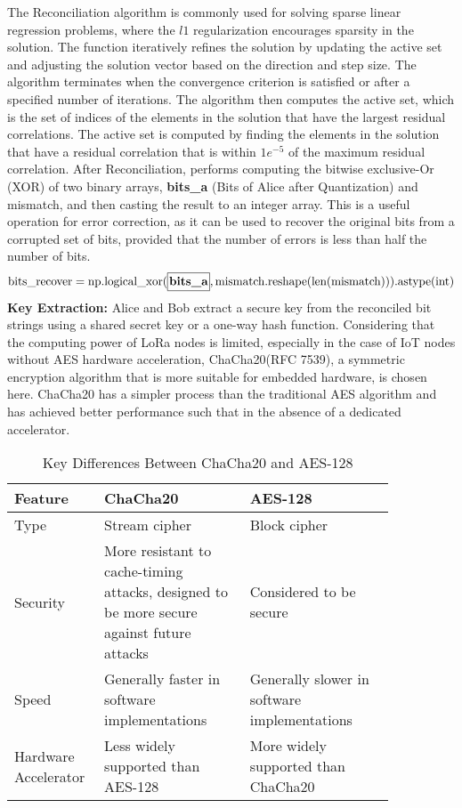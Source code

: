 The Reconciliation algorithm is commonly used for solving sparse linear regression problems, where the \(l1\) regularization encourages sparsity in the solution. The function iteratively refines the solution by updating the active set and adjusting the solution vector based on the direction and step size. The algorithm terminates when the convergence criterion is satisfied or after a specified number of iterations.
The algorithm then computes the active set, which is the set of indices of the elements in the solution that have the largest residual correlations. The active set is computed by finding the elements in the solution that have a residual correlation that is within \(1e^{-5}\) of the maximum residual correlation.
After Reconciliation, performs computing the bitwise exclusive-Or (XOR) of two binary arrays, \textbf{bits\_a} (Bits of Alice after Quantization) and mismatch, and then casting the result to an integer array. This is a useful operation for error correction, as it can be used to recover the original bits from a corrupted set of bits, provided that the number of errors is less than half the number of bits. 
  \[
  \text{{bits\_recover}} = \text{{np.logical\_xor}}(\textbf{\framebox[1.1\width]{{bits\_a}}}, \text{{mismatch}}.\text{{reshape}}(\text{{len}}(\text{{mismatch}}))).\text{{astype(int)}}
  \]
\textbf{Key Extraction:} Alice and Bob extract a secure key from the reconciled bit strings using a shared secret key or a one-way hash function. Considering that the computing power of LoRa nodes is limited, especially in the case of IoT nodes without AES hardware acceleration, ChaCha20(RFC 7539)\cite{rfc7539}, a symmetric encryption algorithm that is more suitable for embedded hardware, is chosen here. ChaCha20 has a simpler process than the traditional AES algorithm and has achieved better performance such that in the absence of a dedicated accelerator\cite{7507408,7927078}.
\begin{table}
    \centering
    \caption{Key Differences Between ChaCha20 and AES-128}
    \begin{tabular}{p{0.15\linewidth}p{0.35\linewidth}p{0.35\linewidth}}
      \toprule
      Feature&ChaCha20&AES-128\\
      \midrule
      Type&Stream cipher&Block cipher\\
      Security&More resistant to cache-timing attacks, designed to be more secure against future attacks&Considered to be secure\\
      Speed&Generally faster in software implementations&Generally slower in software implementations\\
      Hardware Accelerator&Less widely supported than AES-128&More widely supported than ChaCha20    \\
      \bottomrule
    \end{tabular}
    \label{tab:three-line}
\end{table}
